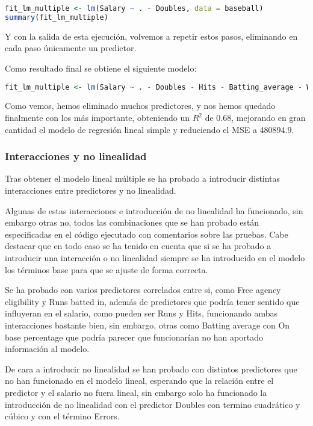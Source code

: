 \begin{lstlisting}[language=R]
fit_lm_multiple <- lm(Salary ~ . - Doubles, data = baseball)
summary(fit_lm_multiple)
\end{lstlisting}

Y con la salida de esta ejecución, volvemos a repetir estos pasos, eliminando en cada paso únicamente un predictor.

Como resultado final se obtiene el siguiente modelo:

\begin{lstlisting}[language=R]
fit_lm_multiple <- lm(Salary ~ . - Doubles - Hits - Batting_average - Walks - `On-base_percentage` - Triples - Arbitration - Errors - Runs - Free_agent, data = baseball)
\end{lstlisting}

Como vemos, hemos eliminado muchos predictores, y nos hemos quedado finalmente con los más importante, obteniendo un $R^2$ de 0.68, mejorando en gran cantidad el modelo de regresión lineal simple y reduciendo el MSE a 480894.9.


\subsubsection{Interacciones y no linealidad}

Tras obtener el modelo lineal múltiple se ha probado a introducir distintas interacciones entre predictores y no linealidad.

Algunas de estas interacciones e introducción de no linealidad ha funcionado, sin embargo otras no, todos las combinaciones que se han probado están especificadas en el código ejecutado con comentarios sobre las pruebas. Cabe destacar que en todo caso se ha tenido en cuenta que si se ha probado a introducir una interacción o no linealidad siempre se ha introducido en el modelo los términos base para que se ajuste de forma correcta.

Se ha probado con varios predictores correlados entre si, como Free agency eligibility y Runs batted in, además de predictores que podría tener sentido que influyeran en el salario, como pueden ser Runs y Hits, funcionando ambas interacciones bastante bien, sin embargo, otras como Batting average con On base percentage que podría parecer que funcionarían no han aportado información al modelo.

De cara a introducir no linealidad se han probado con distintos predictores que no han funcionado en el modelo lineal, esperando que la relación entre el predictor y el salario no fuera lineal, sin embargo solo ha funcionado la introducción de no linealidad con el predictor Doubles con termino cuadrático y cúbico y con el término Errors.


